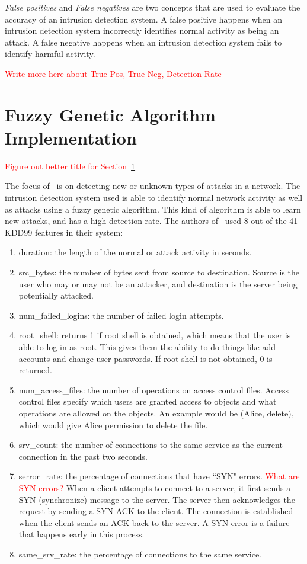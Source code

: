\documentclass{sig-alternate}
\newcommand{\mycomment}[1]{\textcolor{red}{#1}}
\begin{document}
\emph{False positives} and \emph{False negatives} are two concepts that are used to evaluate the accuracy of an intrusion detection system. A false positive happens when an intrusion detection system incorrectly identifies normal activity as being an attack. A false negative happens when an intrusion detection system fails to identify harmful activity.~\cite{Liao201316}

\mycomment{Write more here about True Pos, True Neg, Detection Rate}




\section{Fuzzy Genetic Algorithm Implementation}
\label{sec:fuzGenAlgImp}
\mycomment{Figure out better title for Section~\ref{sec:fuzGenAlgImp}}

The focus of~\cite{6496342, 6559603} is on detecting new or unknown types of attacks in a network. The intrusion detection system used is able to identify normal network activity as well as attacks using a fuzzy genetic algorithm. This kind of algorithm is able to learn new attacks, and has a high detection rate. The authors of~\cite{6496342, 6559603} used 8 out of the 41 KDD99 features in their system: 
\begin{enumerate}
  \item duration: the length of the normal or attack activity in seconds.
  \item src\_bytes: the number of bytes sent from source to destination. Source is the user who may or may not be an attacker, and destination is the server being potentially attacked.
  \item num\_failed\_logins: the number of failed login attempts.
  \item root\_shell: returns 1 if root shell is obtained, which means that the user is able to log in as root. This gives them the ability to do things like add accounts and change user passwords. If root shell is not obtained, 0 is returned.
  \item num\_access\_files: the number of operations on access control files. Access control files specify which users are granted access to objects and what operations are allowed on the objects. An example would be (Alice, delete), which would give Alice permission to delete the file.~\cite{accessControl}
  \item srv\_count: the number of connections to the same service as the current connection in the past two seconds.
  \item serror\_rate: the percentage of connections that have ``SYN" errors. \mycomment{What are SYN errors?} When a client attempts to connect to a server, it first sends a SYN (synchronize) message to the server. The server then acknowledges the request by sending a SYN-ACK to the client. The connection is established when the client sends an ACK back to the server. A SYN error is a failure that happens early in this process.~\cite{TCP}
  \item same\_srv\_rate: the percentage of connections to the same service.
\end{enumerate}
\end{document}
